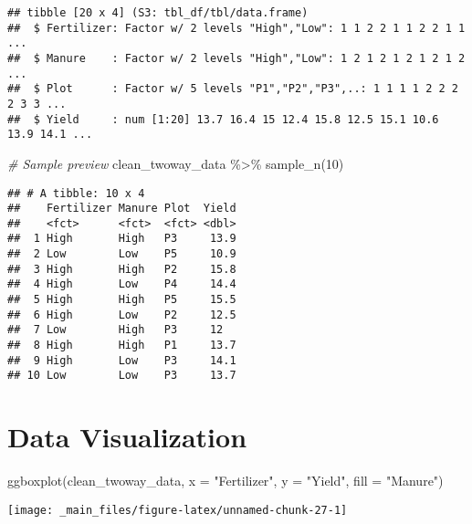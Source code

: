 \documentclass[
]{book}
\newenvironment{Shaded}{\begin{snugshade}}{\end{snugshade}}
\newcommand{\AttributeTok}[1]{\textcolor[rgb]{0.77,0.63,0.00}{#1}}
\newcommand{\CommentTok}[1]{\textcolor[rgb]{0.56,0.35,0.01}{\textit{#1}}}
\newcommand{\DecValTok}[1]{\textcolor[rgb]{0.00,0.00,0.81}{#1}}
\newcommand{\FunctionTok}[1]{\textcolor[rgb]{0.00,0.00,0.00}{#1}}
\newcommand{\NormalTok}[1]{#1}
\newcommand{\SpecialCharTok}[1]{\textcolor[rgb]{0.00,0.00,0.00}{#1}}
\newcommand{\StringTok}[1]{\textcolor[rgb]{0.31,0.60,0.02}{#1}}
\begin{document}
\begin{verbatim}
## tibble [20 x 4] (S3: tbl_df/tbl/data.frame)
##  $ Fertilizer: Factor w/ 2 levels "High","Low": 1 1 2 2 1 1 2 2 1 1 ...
##  $ Manure    : Factor w/ 2 levels "High","Low": 1 2 1 2 1 2 1 2 1 2 ...
##  $ Plot      : Factor w/ 5 levels "P1","P2","P3",..: 1 1 1 1 2 2 2 2 3 3 ...
##  $ Yield     : num [1:20] 13.7 16.4 15 12.4 15.8 12.5 15.1 10.6 13.9 14.1 ...
\end{verbatim}

\begin{Shaded}
\begin{Highlighting}[]
\CommentTok{\# Sample preview}
\NormalTok{clean\_twoway\_data }\SpecialCharTok{\%\textgreater{}\%} 
  \FunctionTok{sample\_n}\NormalTok{(}\DecValTok{10}\NormalTok{)}
\end{Highlighting}
\end{Shaded}

\begin{verbatim}
## # A tibble: 10 x 4
##    Fertilizer Manure Plot  Yield
##    <fct>      <fct>  <fct> <dbl>
##  1 High       High   P3     13.9
##  2 Low        Low    P5     10.9
##  3 High       High   P2     15.8
##  4 High       Low    P4     14.4
##  5 High       High   P5     15.5
##  6 High       Low    P2     12.5
##  7 Low        High   P3     12  
##  8 High       High   P1     13.7
##  9 High       Low    P3     14.1
## 10 Low        Low    P3     13.7
\end{verbatim}

\hypertarget{data-visualization-1}{%
\chapter{Data Visualization}\label{data-visualization-1}}

\begin{Shaded}
\begin{Highlighting}[]
\FunctionTok{ggboxplot}\NormalTok{(clean\_twoway\_data,}
          \AttributeTok{x =} \StringTok{"Fertilizer"}\NormalTok{,}
          \AttributeTok{y =} \StringTok{"Yield"}\NormalTok{,}
          \AttributeTok{fill =} \StringTok{"Manure"}\NormalTok{)}
\end{Highlighting}
\end{Shaded}

\begin{center}\texttt{[image: \_main\_files/figure-latex/unnamed-chunk-27-1]} \end{center}
\end{document}
